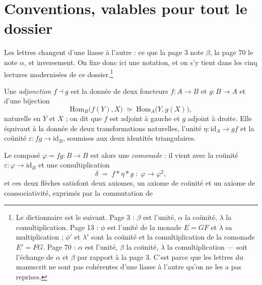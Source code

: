 \documentclass[11pt,a4paper]{article}
\begin{document}
\begin{resume}
\end{resume}

\section*{Conventions, valables pour tout le dossier}

Les lettres changent d'une liasse à l'autre : ce que la page 3 note $\beta$, la
page 70 le note $\alpha$, et inversement. On fixe donc ici une notation, et on
s'y tient dans les cinq lectures modernisées de ce dossier.\footnote{Le
dictionnaire est le suivant. Page 3 : $\beta$ est l'unité, $\alpha$ la coünité,
$\lambda$ la comultiplication. Page 13 : $\phi$ est l'unité de la monade
$E = GF$ et $\lambda$ sa multiplication ; $\phi'$ et $\lambda'$ sont la coünité
et la comultiplication de la comonade $E' = FG$. Page 70 : $\alpha$ est
l'unité, $\beta$ la coünité, $\lambda$ la comultiplication — soit l'échange de
$\alpha$ et $\beta$ par rapport à la page 3. C'est parce que les lettres du
manuscrit ne sont pas cohérentes d'une liasse à l'autre qu'on ne les a pas
reprises.}

Une \emph{adjonction} $f \dashv g$ est la donnée de deux foncteurs
$f : A \to B$ et $g : B \to A$ et d'une bijection
\[
  \mathrm{Hom}_{B}\bigl( f(Y), X \bigr) \;\simeq\;
  \mathrm{Hom}_{A}\bigl( Y, g(X) \bigr) ,
\]
naturelle en $Y$ et $X$ ; on dit que $f$ est adjoint à gauche et $g$ adjoint à
droite. Elle équivaut à la donnée de deux transformations naturelles, l'unité
$\eta : \mathrm{id}_{A} \to gf$ et la coünité
$\varepsilon : fg \to \mathrm{id}_{B}$, soumises aux deux identités
triangulaires.

Le composé $\varphi = fg : B \to B$ est alors une \emph{comonade} : il vient
avec la coünité $\varepsilon : \varphi \to \mathrm{id}_{B}$ et une
comultiplication
\[
  \delta \;=\; f * \eta * g \;:\; \varphi \longrightarrow \varphi^{2} ,
\]
et ces deux flèches satisfont deux axiomes, un axiome de coünité et un axiome
de coassociativité, exprimés par la commutation de
\end{document}
